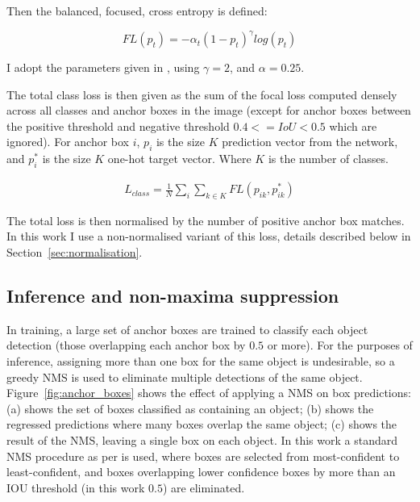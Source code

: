 Then the balanced, focused, cross entropy is defined:

\begin{equation}
FL(p_t) = -\alpha_t (1 - p_t)^\gamma log(p_t)
\label{eq:focal_loss}
\end{equation}

I adopt the parameters given in \cite{Lin2017}, using $ \gamma = 2 $, and $ \alpha = 0.25 $. 

The total class loss is then given as the sum of the focal loss computed densely across all classes and anchor boxes in the image (except for anchor boxes between the positive threshold and negative threshold $0.4 <= IoU < 0.5$ which are ignored). For anchor box $i$, $p_i$ is the size $K$ prediction vector from the network, and $p^*_i$ is the size $K$ one-hot target vector. Where $K$ is the number of classes.

\begin{equation}
\begin{split}
L_{class} = \frac{1}{N}\sum_i{\sum_{k \in K}FL(p_{ik}, p^*_{ik})}
\end{split}
\label{eq:total_loss}
\end{equation}

The total loss is then normalised by the number of positive anchor box matches. In this work I use a non-normalised variant of this loss, details described below in Section~\ref{sec:normalisation}.

\subsection{Inference and non-maxima suppression}

In training, a large set of anchor boxes are trained to classify each object detection (those overlapping each anchor box by $0.5$ or more). For the purposes of inference, assigning more than one box for the same object is undesirable, so a greedy \gls{NMS} is used to eliminate multiple detections of the same object. Figure~\ref{fig:anchor_boxes} shows the effect of applying a \gls{NMS} on box predictions: (a) shows the set of boxes classified as containing an object; (b) shows the regressed predictions where many boxes overlap the same object; (c) shows the result of the \gls{NMS}, leaving a single box on each object. In this work a standard \gls{NMS} procedure as per \cite{Wang2017} is used, where boxes are selected from most-confident to least-confident, and boxes overlapping lower confidence boxes by more than an \gls{IOU} threshold (in this work $0.5$) are eliminated.

